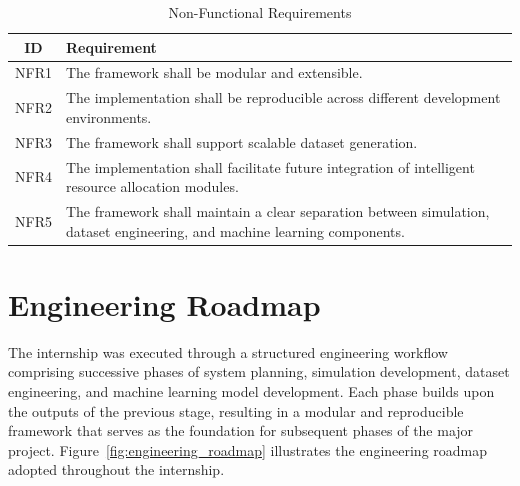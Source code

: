 \documentclass[12pt,a4paper]{report}
\begin{document}
	\begin{table}[H]
		\centering
		\caption{Non-Functional Requirements}
		\label{tab:nonfunctional_requirements}
		
		\begin{tabular}{|c|p{10.5cm}|}
			\hline
			
			\textbf{ID} &
			\textbf{Requirement}
			\\
			\hline
			
			NFR1 &
			The framework shall be modular and extensible.
			\\
			\hline
			
			NFR2 &
			The implementation shall be reproducible across different development environments.
			\\
			\hline
			
			NFR3 &
			The framework shall support scalable dataset generation.
			\\
			\hline
			
			NFR4 &
			The implementation shall facilitate future integration of intelligent resource allocation modules.
			\\
			\hline
			
			NFR5 &
			The framework shall maintain a clear separation between simulation, dataset engineering, and machine learning components.
			\\
			\hline
			
		\end{tabular}
		
	\end{table}
	
	\section{Engineering Roadmap}
	\label{sec:roadmap}
	
	The internship was executed through a structured engineering workflow comprising successive phases of system planning, simulation development, dataset engineering, and machine learning model development. Each phase builds upon the outputs of the previous stage, resulting in a modular and reproducible framework that serves as the foundation for subsequent phases of the major project. Figure~\ref{fig:engineering_roadmap} illustrates the engineering roadmap adopted throughout the internship.
	
\end{document}
